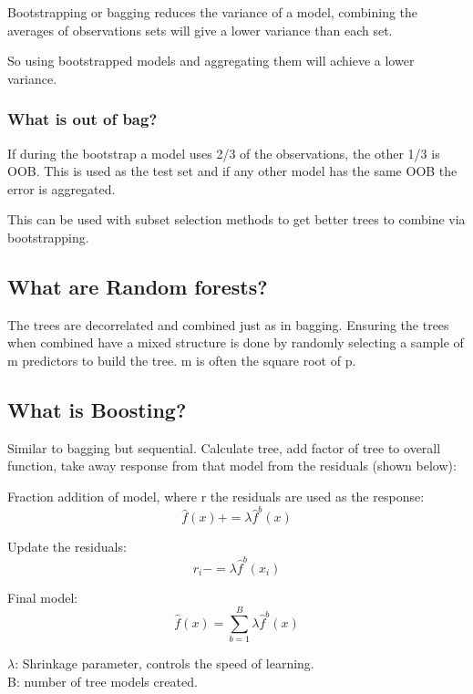 \documentclass[11pt]{scrartcl} %
\begin{document}
Bootstrapping or bagging reduces the variance of a model, combining the averages of observations sets
will give a lower variance than each set.

So using bootstrapped models and aggregating them will achieve a lower variance.

\subsubsection{What is out of bag?}

If during the bootstrap a model uses 2/3 of the observations, the other 1/3 is OOB. This is used
as the test set and if any other model has the same OOB the error is aggregated.

This can be used with subset selection methods to get better trees to combine via bootstrapping.

\subsection{What are Random forests?}

The trees are decorrelated and combined just as in bagging. Ensuring the trees when combined have a
mixed structure is done by randomly selecting a sample of m predictors to build the tree. m is often
the square root of p.

\subsection{What is Boosting?}

Similar to bagging but sequential. Calculate tree, add factor of tree to overall function, take away
response from that model from the residuals (shown below):

Fraction addition of model, where r the residuals are used as the response:
\begin{equation}
	\hat{f}(x) += \lambda \hat{f}^b(x)
\end{equation}

Update the residuals:
\begin{equation}
	r_i -= \lambda \hat{f}^b(x_i)
\end{equation}

Final model:
\begin{equation}
	\hat{f}(x) = \sum^B_{b=1}{\lambda\hat{f}^b(x)}
\end{equation}

\(\lambda\): Shrinkage parameter, controls the speed of learning.\\
B: number of tree models created.\\
\end{document}
